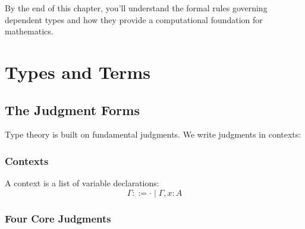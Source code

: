 \documentclass[12pt,openright,twoside]{book}
\theoremstyle{plain}
\theoremstyle{definition}
\theoremstyle{remark}
\begin{document}
By the end of this chapter, you'll understand the formal rules governing dependent types and how they provide a computational foundation for mathematics.

\section{Types and Terms}
\label{sec:types-and-terms}

\subsection{The Judgment Forms}

Type theory is built on fundamental judgments. We write judgments in contexts:

\subsubsection{Contexts}
A context is a list of variable declarations:
\[
\Gamma ::= \cdot \mid \Gamma, x : A
\]

\subsubsection{Four Core Judgments}
\end{document}
